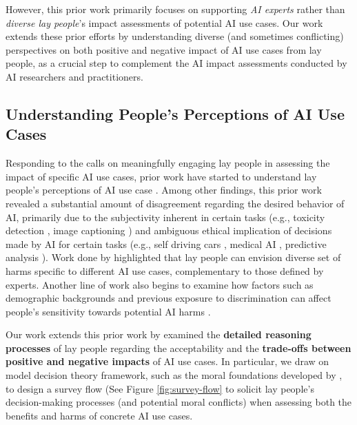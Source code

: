 However, this prior work primarily focuses on supporting \textit{AI experts} rather than \textit{diverse lay people}'s impact assessments of potential AI use cases. Our work extends these prior efforts by understanding diverse (and sometimes conflicting) perspectives on both positive and negative impact of AI use cases from lay people, as a crucial step to complement the AI impact assessments conducted by AI researchers and practitioners. 


\subsection{Understanding People's Perceptions of AI Use Cases}
\label{ssec:understanding-}
Responding to the calls on meaningfully engaging lay people in assessing the impact of specific AI use cases, prior work have started to understand lay people's perceptions of AI use case \cite{buccinca2023aha, kieslich2023anticipating, mun2024participaidemocraticsurveyingframework, kingsley2024investigating}. Among other findings, this prior work revealed a substantial amount of disagreement regarding the desired behavior of AI, primarily due to the subjectivity inherent in certain tasks (e.g., toxicity detection \citep{sap2019risk, blodgett2020language}, image captioning \citep{zhao2021understanding}) and ambiguous ethical implication of decisions made by AI for certain tasks (e.g., self driving cars \citep{awad2018moral}, medical AI \citep{chen2023algorithmic}, predictive analysis \citep{barocas2016big}). Work done by 
\citeauthor{mun2024participaidemocraticsurveyingframework} highlighted that lay people can envision diverse set of harms specific to different AI use cases, complementary to those defined by experts. Another line of work also begins to examine how factors such as demographic backgrounds and previous exposure to discrimination can affect people's sensitivity towards potential AI harms \citep{kingsley2024investigating}. 

Our work extends this prior work by examined the \textbf{detailed reasoning processes} of lay people regarding the acceptability and the \textbf{trade-offs between positive and negative impacts} of AI use cases. In particular, we draw on model decision theory framework, such as the moral foundations developed by \citeauthor{graham2008moral}, to design a survey flow (See Figure \ref{fig:survey-flow} to solicit lay people's decision-making processes (and potential moral conflicts) when assessing both the benefits and harms of concrete AI use cases. 

